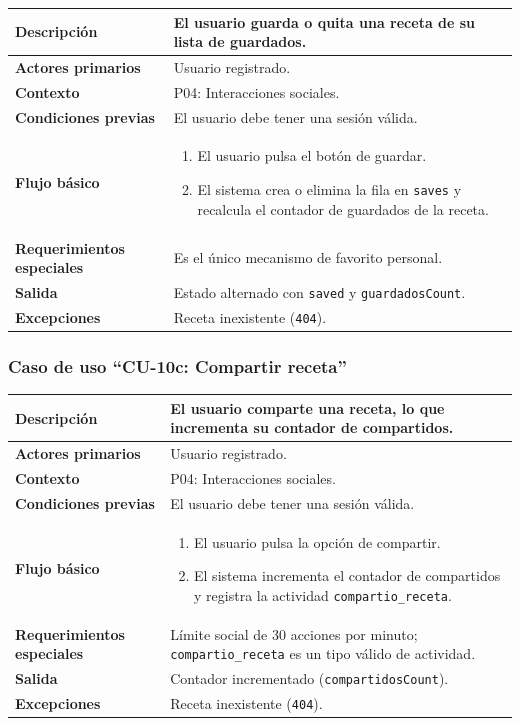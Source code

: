 \documentclass[doc,12pt,a4paper]{apa7}
\begin{document}
\begin{longtable}{|P{3.3cm}|L{11.2cm}|}
\hline
\textbf{Descripción} & El usuario guarda o quita una receta de su lista de guardados. \\ \hline
\textbf{Actores primarios} & Usuario registrado. \\ \hline
\textbf{Contexto} & P04: Interacciones sociales. \\ \hline
\textbf{Condiciones previas} & El usuario debe tener una sesión válida. \\ \hline
\textbf{Flujo básico} &
\begin{enumerate}
    \item El usuario pulsa el botón de guardar.
    \item El sistema crea o elimina la fila en \texttt{saves} y recalcula el contador de guardados de la receta.
\end{enumerate} \\ \hline
\textbf{Requerimientos especiales} & Es el único mecanismo de favorito personal. \\ \hline
\textbf{Salida} & Estado alternado con \texttt{saved} y \texttt{guardadosCount}. \\ \hline
\textbf{Excepciones} & Receta inexistente (\texttt{404}). \\ \hline
\end{longtable}

\subsubsection{Caso de uso ``CU-10c: Compartir receta''}

\begin{longtable}{|P{3.3cm}|L{11.2cm}|}
\hline
\textbf{Descripción} & El usuario comparte una receta, lo que incrementa su contador de compartidos. \\ \hline
\textbf{Actores primarios} & Usuario registrado. \\ \hline
\textbf{Contexto} & P04: Interacciones sociales. \\ \hline
\textbf{Condiciones previas} & El usuario debe tener una sesión válida. \\ \hline
\textbf{Flujo básico} &
\begin{enumerate}
    \item El usuario pulsa la opción de compartir.
    \item El sistema incrementa el contador de compartidos y registra la actividad \texttt{compartio\_receta}.
\end{enumerate} \\ \hline
\textbf{Requerimientos especiales} & Límite social de 30 acciones por minuto; \texttt{compartio\_receta} es un tipo válido de actividad. \\ \hline
\textbf{Salida} & Contador incrementado (\texttt{compartidosCount}). \\ \hline
\textbf{Excepciones} & Receta inexistente (\texttt{404}). \\ \hline
\end{longtable}
\end{document}
